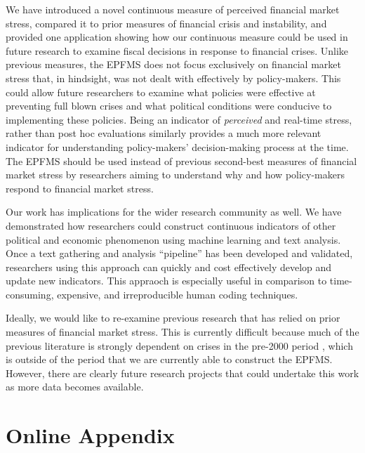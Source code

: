 \documentclass[]{article}
\begin{document}
We have introduced a novel continuous measure of perceived financial market stress, compared it to prior measures of financial crisis and instability, and provided one application showing how our continuous measure could be used in future research to examine fiscal decisions in response to financial crises. Unlike previous measures, the EPFMS does not focus exclusively on financial market stress that, in hindsight, was not dealt with effectively by policy-makers. This could allow future researchers to examine what policies were effective at preventing full blown crises and what political conditions were conducive to implementing these policies. Being an indicator of \emph{perceived} and real-time stress, rather than post hoc evaluations similarly provides a much more relevant indicator for understanding policy-makers' decision-making process at the time. The EPFMS should be used instead of previous second-best measures of financial market stress by researchers aiming to understand why and how policy-makers respond to financial market stress.

Our work has implications for the wider research community as well. We have demonstrated how researchers could construct continuous indicators of other political and economic phenomenon using machine learning and text analysis. Once a text gathering and analysis ``pipeline'' \citep{Leek2015} has been developed and validated, researchers using this approach can quickly and cost effectively develop and update new indicators. This appraoch is especially useful in comparison to time-consuming, expensive, and irreproducible human coding techniques.

Ideally, we would like to re-examine previous research that has relied on prior measures of financial market stress. This is currently difficult because much of the previous literature is strongly dependent on crises in the pre-2000 period \citep[see][]{GandrudHallerberg2015}, which is outside of the period that we are currently able to construct the EPFMS. However, there are clearly future research projects that could undertake this work as more data becomes available.




\clearpage

\section*{Online Appendix}

\end{document}
